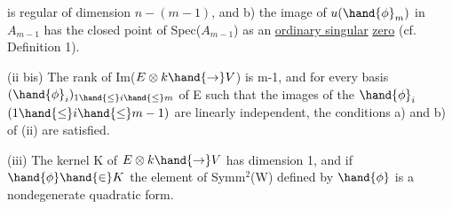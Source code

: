 
is  regular of dimension $n-(m-1)$, and b) the image of $u(\hand{\phi}_m)$
in $A_{m-1}$ has the closed point of Spec($A_{m-1}$) as an \uline{ordinary singular}
\uline{zero} (cf. Definition 1).

(ii bis)  The rank of Im($E\otimes k \hand{\to} V$) is m-1, and for
every basis $(\hand{\phi}_i)_{1\hand{\leq} i\hand{\leq} m}$ of E such that the images of the $\hand{\phi}_i$ $(1\hand{\leq} i\hand{\leq} m-1)$ 
are linearly independent, the conditions a) and b) of (ii) are
satisfied.

(iii) The kernel  K of $E\otimes k \hand{\to} V$ has dimension 1, and if $\hand{\phi}\hand{\in} K$
 the element of Symm$^2$(W) defined by $\hand{\phi}$ is a nondegenerate
quadratic form.


